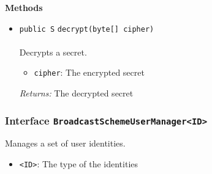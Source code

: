 \textbf{\sffamily Methods}
\begin{itemize}
\item \lstinline|public S| \lstinline|decrypt|\lstinline|(byte[] cipher)|\\ \\[-0.6em]
Decrypts a secret.
\begin{itemize}
\item \lstinline|cipher|: The encrypted secret
\end{itemize}

\emph{Returns:} The decrypted secret

\end{itemize}

\subsubsection{Interface \lstinline|BroadcastSchemeUserManager<ID>|}
Manages a set of user identities. \\
\noindent\begin{minipage}[t]{5cm}
\vspace{0.3em}
\hspace*{2em}
\vspace{0.3em}
\end{minipage}

\begin{itemize}
\item \lstinline|<ID>|: The type of the identities
\end{itemize}




